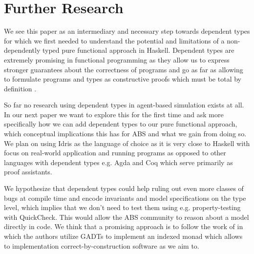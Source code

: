 \section{Further Research}
\label{sec:further_research}

We see this paper as an intermediary and necessary step towards dependent types for which we first needed to understand the potential and limitations of a non-dependently typed pure functional approach in Haskell. Dependent types are extremely promising in functional programming as they allow us to express stronger guarantees about the correctness of programs and go as far as allowing to formulate programs and types as constructive proofs which must be total by definition \cite{thompson_type_1991, mckinna_why_2006, altenkirch_pi_2010}.

So far no research using dependent types in agent-based simulation exists at all. In our next paper we want to explore this for the first time and ask more specifically how we can add dependent types to our pure functional approach, which conceptual implications this has for ABS and what we gain from doing so. We plan on using Idris \cite{brady_idris_2013} as the language of choice as it is very close to Haskell with focus on real-world application and running programs as opposed to other languages with dependent types e.g. Agda and Coq which serve primarily as proof assistants.

We hypothesize that dependent types could help ruling out even more classes of bugs at compile time and encode invariants and model specifications on the type level, which implies that we don't need to test them using e.g. property-testing with QuickCheck. This would allow the ABS community to reason about a model directly in code. We think that a promising approach is to follow the work of \cite{brady_correct-by-construction_2010, brady_idris_2011, brady_programming_2013, fowler_dependent_2014, brady_state_2016} in which the authors utilize GADTs to implement an indexed monad which allows to implementation correct-by-construction software as we aim to.


